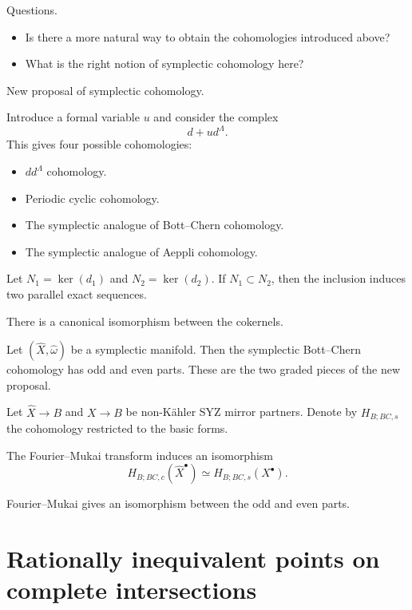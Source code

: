 \medskip\noindent
Questions.
\begin{itemize}
\item Is there a more natural way to
obtain the cohomologies introduced
above?
\item What is the right notion of
symplectic cohomology here?
\end{itemize}

\medskip\noindent
New proposal of symplectic cohomology.

Introduce a formal variable $u$ and
consider the complex
$$
d+ud^\Lambda.
$$
This gives four possible cohomologies:
\begin{itemize}
\item $dd^\Lambda$ cohomology.
\item Periodic cyclic cohomology.
\item The symplectic analogue of
Bott--Chern cohomology.
\item The symplectic analogue of
Aeppli cohomology.
\end{itemize}

Let $N_1=\ker(d_1)$ and $N_2=\ker(d_2)$.
If $N_1\subset N_2$, then the inclusion
induces two parallel exact sequences.

\begin{lemma}
\label{lemma-cokernels}
There is a canonical isomorphism
between the cokernels.
\end{lemma}

\begin{theorem}
\label{theorem-symplectic-bc}
Let $(\widehat X,\widehat\omega)$ be
a symplectic manifold.
Then the symplectic Bott--Chern
cohomology has odd and even parts.
These are the two graded pieces of
the new proposal.
\end{theorem}

\medskip\noindent
Let $\widehat X\to B$ and $X\to B$
be non-K\"ahler SYZ mirror partners.
Denote by $H_{B;BC,s}$ the cohomology
restricted to the basic forms.

\begin{theorem}
\label{theorem-fourier-nukari}
The Fourier--Mukai transform induces
an isomorphism
$$
H_{B;BC,c}(\widehat X^\bullet)
\simeq
H_{B;BC,s}(X^\bullet).
$$
\end{theorem}

\begin{lemma}
Fourier--Mukai gives an isomorphism
between the odd and even parts.
\end{lemma}

\section{Rationally inequivalent
points on complete intersections}
\label{section-olivier-martin}


